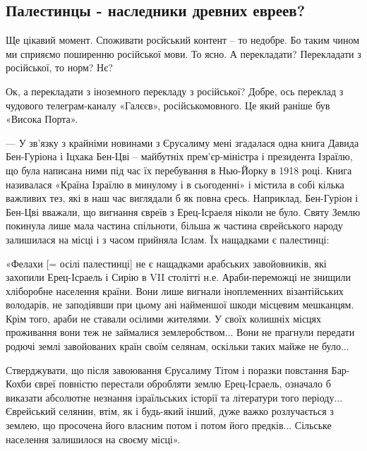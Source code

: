  
 
 
 
 
\subsection{Палестинцы - наследники древних евреев?}
\label{sec:12_05_2021.fb.korsun_vasyl.1.izrail_palestina}

Ще цікавий момент. Споживати росйський контент – то недобре. Бо таким чином ми
сприяємо поширенню російської мови. То ясно.  А перекладати? Перекладати з
російської, то норм? Нє?

Ок, а перекладати з іноземного перекладу з російської?  Добре, ось переклад з
чудового телеграм-каналу «Галєєв», російськомовного. Це який раніше був «Висока
Порта».

—
У зв'язку з крайніми новинами з Єрусалиму мені згадалася одна книга Давида
Бен-Гуріона і Іцхака Бен-Цві – майбутніх прем'єр-міністра і президента Ізраїлю,
що була написана ними під час їх перебування в Нью-Йорку в 1918 році. Книга
називалася «Країна Ізраїлю в минулому і в сьогоденні» і містила в собі кілька
важливих тез, які в наш час виглядали б як повна єресь. Наприклад, Бен-Гуріон і
Бен-Цві вважали, що вигнання євреїв з Ерец-Ісраеля ніколи не було. Святу Землю
покинула лише мала частина спільноти, більша ж частина єврейського народу
залишилася на місці і з часом прийняла Іслам. Їх нащадками є палестинці:

«Фелахи [= осілі палестинці] не є нащадками арабських завойовників, які
захопили Ерец-Ісраель і Сирію в VII столітті н.е. Араби-переможці не знищили
хліборобне населення країни. Вони лише вигнали іноплеменних візантійських
володарів, не заподіявши при цьому ані найменшої шкоди місцевим мешканцям. Крім
того, араби не ставали осілими жителями. У своїх колишніх місцях проживання
вони теж не займалися землеробством... Вони не прагнули передати родючі землі
завойованих країн своїм селянам, оскільки таких майже не було...

Стверджувати, що після завоювання Єрусалиму Тітом і поразки повстання Бар-Кохби
євреї повністю перестали обробляти землю Ерец-Ісраель, означало б виказати
абсолютне незнання ізраїльських історії та літератури того періоду...
Єврейський селянин, втім, як і будь-який інший, дуже важко розлучається з
землею, що просочена його власним потом і потом його предків... Сільське
населення залишилося на своєму місці».

